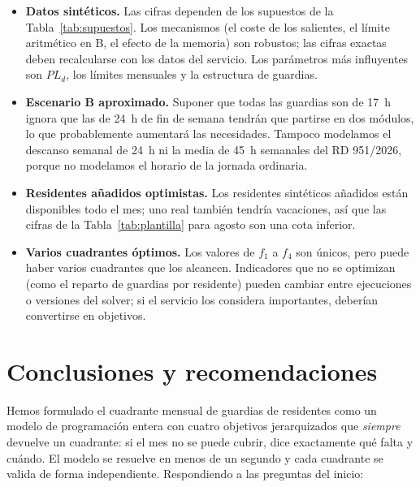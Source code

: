 \begin{itemize}
  \item \textbf{Datos sintéticos.} Las cifras dependen de los supuestos de la Tabla~\ref{tab:supuestos}. Los mecanismos (el coste de los salientes, el límite aritmético en B, el efecto de la memoria) son robustos; las cifras exactas deben recalcularse con los datos del servicio. Los parámetros más influyentes son $PL_d$, los límites mensuales y la estructura de guardias.
  \item \textbf{Escenario B aproximado.} Suponer que todas las guardias son de 17~h ignora que las de 24~h de fin de semana tendrán que partirse en dos módulos, lo que probablemente aumentará las necesidades. Tampoco modelamos el descanso semanal de 24~h ni la media de 45~h semanales del RD 951/2026, porque no modelamos el horario de la jornada ordinaria.
  \item \textbf{Residentes añadidos optimistas.} Los residentes sintéticos añadidos están disponibles todo el mes; uno real también tendría vacaciones, así que las cifras de la Tabla~\ref{tab:plantilla} para agosto son una cota inferior.
  \item \textbf{Varios cuadrantes óptimos.} Los valores de $f_1$ a $f_4$ son únicos, pero puede haber varios cuadrantes que los alcancen. Indicadores que no se optimizan (como el reparto de guardias por residente) pueden cambiar entre ejecuciones o versiones del solver; si el servicio los considera importantes, deberían convertirse en objetivos.
\end{itemize}

\section{Conclusiones y recomendaciones}
\label{sec:conclusiones}

Hemos formulado el cuadrante mensual de guardias de residentes como un modelo de programación entera con cuatro objetivos jerarquizados que \emph{siempre} devuelve un cuadrante: si el mes no se puede cubrir, dice exactamente qué falta y cuándo. El modelo se resuelve en menos de un segundo y cada cuadrante se valida de forma independiente. Respondiendo a las preguntas del inicio:

